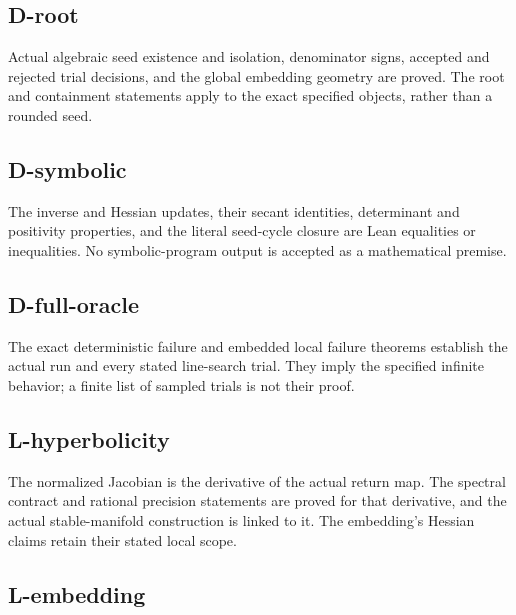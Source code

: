 

\subsection{D-root}\label{d-root}

Actual algebraic seed existence and isolation, denominator signs, accepted and rejected trial decisions, and the global embedding geometry are proved. The root and containment statements apply to the exact specified objects, rather than a rounded seed.



\subsection{D-symbolic}\label{d-symbolic}

The inverse and Hessian updates, their secant identities, determinant and positivity properties, and the literal seed-cycle closure are Lean equalities or inequalities. No symbolic-program output is accepted as a mathematical premise.



\subsection{D-full-oracle}\label{d-full-oracle}

The exact deterministic failure and embedded local failure theorems establish the actual run and every stated line-search trial. They imply the specified infinite behavior; a finite list of sampled trials is not their proof.



\subsection{L-hyperbolicity}\label{l-hyperbolicity}

The normalized Jacobian is the derivative of the actual return map. The spectral contract and rational precision statements are proved for that derivative, and the actual stable-manifold construction is linked to it. The embedding's Hessian claims retain their stated local scope.



\subsection{L-embedding}\label{l-embedding}

